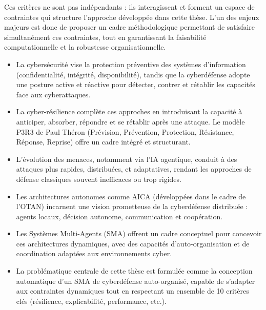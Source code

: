 \documentclass[ twoside,openright,titlepage,numbers=noenddot,headinclude,%
                footinclude=true,cleardoublepage=empty,abstractoff, %
                BCOR=5mm,paper=a4,fontsize=11pt,%
                french,american,%
                ]{scrreprt}
\begin{document}
Ces critères ne sont pas indépendants : ils interagissent et forment un espace de contraintes qui structure l'approche développée dans cette thèse. L'un des enjeux majeurs est donc de proposer un cadre méthodologique permettant de satisfaire simultanément ces contraintes, tout en garantissant la faisabilité computationnelle et la robustesse organisationnelle.

\begin{tcolorbox}[colback=gray!5!white, colframe=gray!60!black, title={\faLightbulbO{} Points clés à retenir du Chapitre 1}]
\begin{itemize}
    \item La cybersécurité vise la protection préventive des systèmes d'information (confidentialité, intégrité, disponibilité), tandis que la cyberdéfense adopte une posture active et réactive pour détecter, contrer et rétablir les capacités face aux cyberattaques.
    
    \item La cyber-résilience complète ces approches en introduisant la capacité à anticiper, absorber, répondre et se rétablir après une attaque. Le modèle P3R3 de Paul Théron (Prévision, Prévention, Protection, Résistance, Réponse, Reprise) offre un cadre intégré et structurant.

    \item L'évolution des menaces, notamment via l'IA agentique, conduit à des attaques plus rapides, distribuées, et adaptatives, rendant les approches de défense classiques souvent inefficaces ou trop rigides.

    \item Les architectures autonomes comme AICA (développées dans le cadre de l'OTAN) incarnent une vision prometteuse de la cyberdéfense distribuée : agents locaux, décision autonome, communication et coopération.

    \item Les Systèmes Multi-Agents (SMA) offrent un cadre conceptuel pour concevoir ces architectures dynamiques, avec des capacités d'auto-organisation et de coordination adaptées aux environnements cyber.

    \item La problématique centrale de cette thèse est formulée comme la conception automatique d'un SMA de cyberdéfense auto-organisé, capable de s'adapter aux contraintes dynamiques tout en respectant un ensemble de 10 critères clés (résilience, explicabilité, performance, etc.).
\end{itemize}
\end{tcolorbox}
\end{document}
